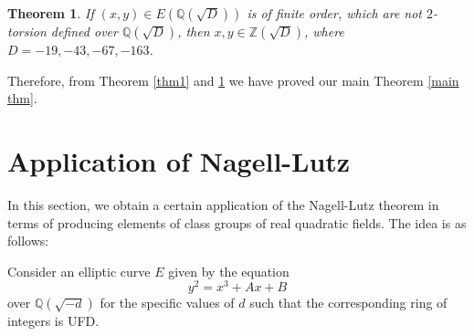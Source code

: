 \documentclass[12pt,leqno]{amsart}
\newcommand{\<}{\langle}
\renewcommand{\>}{\rangle}
\newtheorem{theorem}{Theorem}
\theoremstyle{definition}
\numberwithin{equation}{section}
\begin{document}
\begin{theorem}\label{thm2}
    If $(x,y)\in E(\mathbb Q(\sqrt{D}))$ is of finite order, which are not $2$-torsion defined over $\mathbb{Q}(\sqrt{D})$, then $x,y\in \mathbb Z(\sqrt{D})$, where $D=-19, -43, -67, -163$.
\end{theorem}
Therefore, from Theorem \ref{thm1} and \ref{thm2} we have proved our main Theorem \ref{main thm}.

\section{Application of Nagell-Lutz}
In this section, we obtain a certain application of the Nagell-Lutz theorem in terms of producing elements of class groups of real quadratic fields. The idea is as follows:

Consider an elliptic curve $E$ given by the equation
$$y^2=x^3+Ax+B$$
over $\mathbb{Q}(\sqrt{-d})$ for the specific values of $d$ such that the corresponding ring of integers is UFD.


\end{document}
